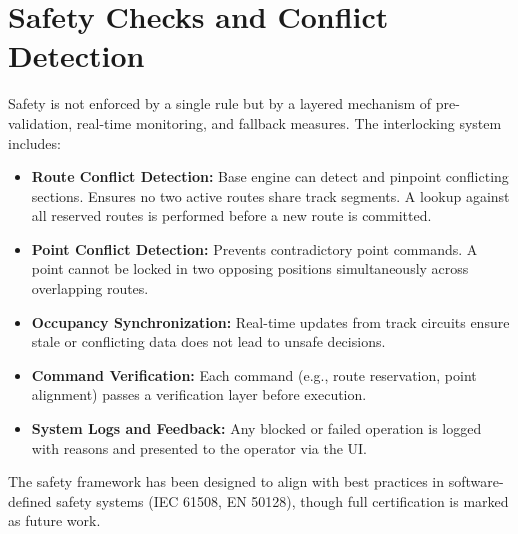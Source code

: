 \section{Safety Checks and Conflict Detection}
\label{sec:interlocking:safety-checks}

Safety is not enforced by a single rule but by a layered mechanism of pre-validation, real-time monitoring, and fallback measures. The interlocking system includes:

\begin{itemize}
\item \textbf{Route Conflict Detection:} Base engine can detect and pinpoint conflicting sections. Ensures no two active routes share track segments. A lookup against all reserved routes is performed before a new route is committed.
\item \textbf{Point Conflict Detection:} Prevents contradictory point commands. A point cannot be locked in two opposing positions simultaneously across overlapping routes.
\item \textbf{Occupancy Synchronization:} Real-time updates from track circuits ensure stale or conflicting data does not lead to unsafe decisions.
\item \textbf{Command Verification:} Each command (e.g., route reservation, point alignment) passes a verification layer before execution.
\item \textbf{System Logs and Feedback:} Any blocked or failed operation is logged with reasons and presented to the operator via the UI.
\end{itemize}

The safety framework has been designed to align with best practices in software-defined safety systems (IEC 61508, EN 50128), though full certification is marked as future work.
